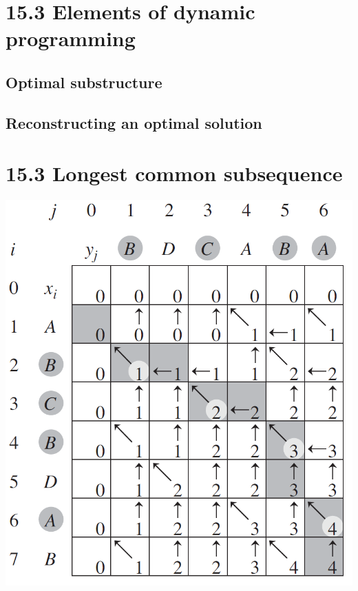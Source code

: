 \documentclass[a4paper]{article}
\begin{document}
\section*{15.3 Elements of dynamic programming}
\subsection*{Optimal substructure}
\subsection*{Reconstructing an optimal solution}

\section*{15.3 Longest common subsequence}
\begin{center}
    \includegraphics[scale=0.8]{"Longest common subsequence"}
\end{center}
\end{document}
